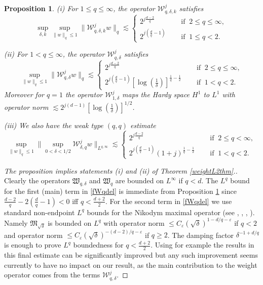 \documentclass[11pt]{amsart}
\newtheorem{proposition}[theorem]{Proposition}
\theoremstyle{definition}
\numberwithin{theorem}{section}
\numberwithin{definition}{section}
\newcommand{\note}[1]{\footnote{\texttt{\Small #1}}}
\def\lc{\lesssim}
\def\eps{\varepsilon}
\def\fM{{\mathfrak {M}}}
\def\fW{{\mathfrak {W}}}
\def\cW{{\mathcal {W}}}
\begin{document}
\begin{proposition}  \label{maximaltheorem} %
(i) For $1\le q\le \infty$, the operator $\cW^j_{q, \delta,k}$
%
%
 satisfies
$$\sup_{\delta,k} \sup_{\|w\|_q\le 1} \|\cW^j_{q,\delta, k} w\|_q\lc
\begin{cases} 2^{j\frac{d-2}q} \quad&\text{ if }\ 2\le q\le\infty,
\\
2^{j(\frac dq -1)} \quad&\text{ if }\ 1\le q< 2.
\end{cases}
$$

\noindent (ii) For $1<q\le \infty$, the operator $\cW^j_{q, \delta}$
satisfies
$$\sup_{\|w\|_q\le 1} \|\cW^j_{q,\delta}w\|_q\lc
\begin{cases} 2^{j\frac{d-2}q} \quad&\text{ if }\ 2\le q\le\infty,
\\
2^{j(\frac dq -1)} [\log(\frac 1\delta)]^{\frac 1q-\frac 12}\quad&\text{ if }\ 1< q< 2.
\end{cases}
$$
Moreover for $q=1$ the operator $\cW^j_{1, \delta}$  maps the Hardy space
$H^1$ to $L^1$ with operator norm $\lc
2^{j(d -1)} [\log(\frac 1\delta)]^{1/2}$.

\noindent (iii)
We also have the weak type $(q,q)$ estimate
$$
\sup_{\|w\|_q\le 1}
\big\| \sup_{0<\delta<1/2} \cW^j_{\delta,q} w\big\|_{L^{q,\infty}}
\lc \begin{cases} 2^{j\frac{d-2}q} \quad&\text{ if }\ 2\le q< \infty,
\\
2^{j(\frac dq -1)}(1+j)^{\frac 1q-\frac 12} \quad&\text{ if }\ 1< q< 2.
\end{cases}
$$
\end{proposition}
\begin{proof}[The proposition implies statements
(i) and (ii) of  Theorem \ref{weightL2thm}.] Clearly  the
operators $\fW_{q,\delta}$ and $\fW_q$ are bounded on $L^\infty$ if
$q<d$.
The $L^q$ bound for the first (main) term in
\eqref{fWqdel} is immediate from Proposition \ref{maximaltheorem}
since $\frac{d-2}{q}-2(\frac dq -1)<0$ iff $q<\frac{d+2}{2}$. For
the second term  in \eqref{fWqdel} we use standard non-endpoint
$L^q$ bounds for the Nikodym maximal operator (see \cite{co0},
\cite{co1}, \cite{bo}, \cite{mss}). Namely $\fM_{\sqrt\delta}$
is bounded on $L^q$ with operator norm $\le C_\eps
(\sqrt \delta)^{1- d/q-\eps}$ if $q<2$
and operator norm
$\le C_\eps
(\sqrt \delta)^{- (d-2)/q-\eps}$ if $q\ge 2$.
The damping factor $\delta^{-1+d/q}$ is enough to prove $L^q$ boundedness for
$q<\frac{d+2}2$. Using for example the results in \cite{wo}   this final estimate
can be significantly improved but any such  improvement  seems currently
to have  no
impact on our result, as the main contribution to the weight operator
comes from  the terms $\cW_{q,\delta}^j$.
\end{proof}
\end{document}
